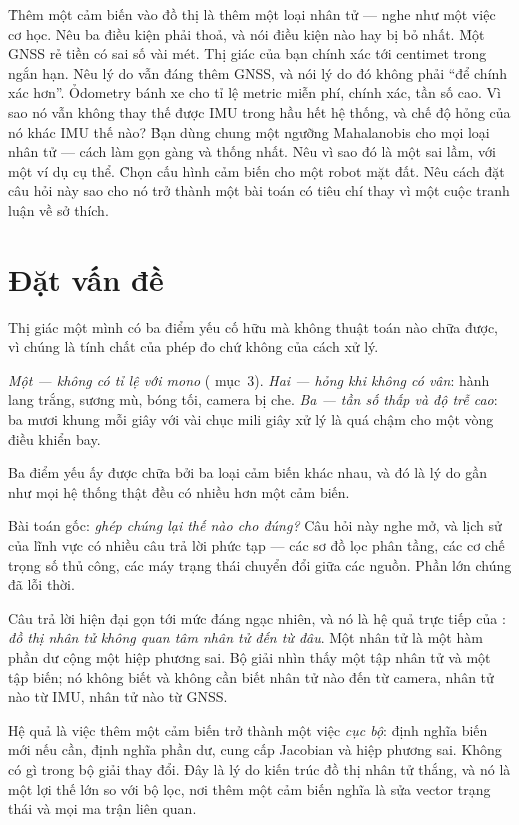\documentclass[../../vslam.tex]{subfiles}
\begin{document}
\begin{khoigoi}
\h{Thêm một cảm biến vào đồ thị là thêm một loại nhân tử --- nghe như một việc cơ học. Nêu ba điều kiện phải thoả, và nói điều kiện nào hay bị bỏ nhất.}
\h{Một GNSS rẻ tiền có sai số vài mét. Thị giác của bạn chính xác tới centimet trong ngắn hạn. Nêu lý do vẫn đáng thêm GNSS, và nói lý do đó không phải ``để chính xác hơn''.}
\h{Odometry bánh xe cho tỉ lệ metric miễn phí, chính xác, tần số cao. Vì sao nó vẫn không thay thế được IMU trong hầu hết hệ thống, và chế độ hỏng của nó khác IMU thế nào?}
\h{Bạn dùng chung một ngưỡng Mahalanobis cho mọi loại nhân tử --- cách làm gọn gàng và thống nhất. Nêu vì sao đó là một sai lầm, với một ví dụ cụ thể.}
\h{Chọn cấu hình cảm biến cho một robot mặt đất. Nêu cách đặt câu hỏi này sao cho nó trở thành một bài toán có tiêu chí thay vì một cuộc tranh luận về sở thích.}
\end{khoigoi}

\section{Đặt vấn đề}

Thị giác một mình có ba điểm yếu cố hữu mà không thuật toán nào chữa được, vì chúng là tính chất của phép đo chứ không của cách xử lý.

\emph{Một --- không có tỉ lệ với mono} ( mục~3). \emph{Hai --- hỏng khi không có vân}: hành lang trắng, sương mù, bóng tối, camera bị che. \emph{Ba --- tần số thấp và độ trễ cao}: ba mươi khung mỗi giây với vài chục mili giây xử lý là quá chậm cho một vòng điều khiển bay.

Ba điểm yếu ấy được chữa bởi ba loại cảm biến khác nhau, và đó là lý do gần như mọi hệ thống thật đều có nhiều hơn một cảm biến.

Bài toán gốc: \emph{ghép chúng lại thế nào cho đúng?} Câu hỏi này nghe mở, và lịch sử của lĩnh vực có nhiều câu trả lời phức tạp --- các sơ đồ lọc phân tầng, các cơ chế trọng số thủ công, các máy trạng thái chuyển đổi giữa các nguồn. Phần lớn chúng đã lỗi thời.

Câu trả lời hiện đại gọn tới mức đáng ngạc nhiên, và nó là hệ quả trực tiếp của : \emph{đồ thị nhân tử không quan tâm nhân tử đến từ đâu}. Một nhân tử là một hàm phần dư cộng một hiệp phương sai. Bộ giải nhìn thấy một tập nhân tử và một tập biến; nó không biết và không cần biết nhân tử nào đến từ camera, nhân tử nào từ IMU, nhân tử nào từ GNSS.

Hệ quả là việc thêm một cảm biến trở thành một việc \emph{cục bộ}: định nghĩa biến mới nếu cần, định nghĩa phần dư, cung cấp Jacobian và hiệp phương sai. Không có gì trong bộ giải thay đổi. Đây là lý do kiến trúc đồ thị nhân tử thắng, và nó là một lợi thế lớn so với bộ lọc, nơi thêm một cảm biến nghĩa là sửa vector trạng thái và mọi ma trận liên quan.
\end{document}
